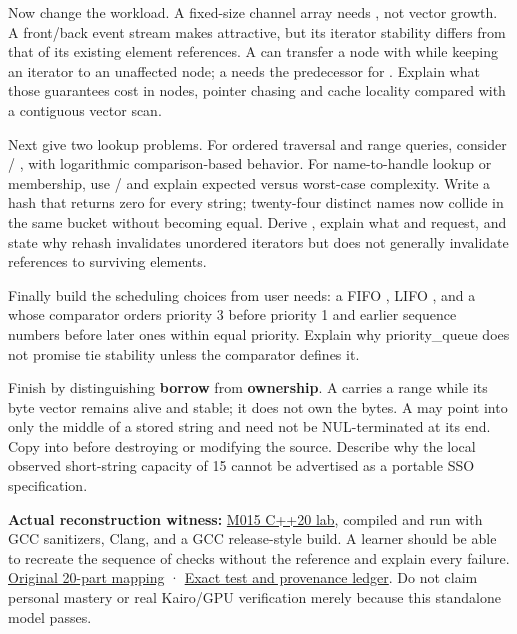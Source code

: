 Now change the workload. A fixed-size channel array needs , not vector growth. A front/back event stream makes  attractive, but its iterator stability differs from that of its existing element references. A  can transfer a node with  while keeping an iterator to an unaffected node; a  needs the predecessor for . Explain what those guarantees cost in nodes, pointer chasing and cache locality compared with a contiguous vector scan.

Next give two lookup problems. For ordered traversal and range queries, consider  / , with logarithmic comparison-based behavior. For name-to-handle lookup or membership, use  /  and explain expected versus worst-case complexity. Write a hash that returns zero for every string; twenty-four distinct names now collide in the same bucket without becoming equal. Derive , explain what  and  request, and state why rehash invalidates unordered iterators but does not generally invalidate references to surviving elements.

Finally build the scheduling choices from user needs: a FIFO , LIFO , and a  whose comparator orders priority 3 before priority 1 and earlier sequence numbers before later ones within equal priority. Explain why priority\_queue does not promise tie stability unless the comparator defines it.

Finish by distinguishing \textbf{borrow} from \textbf{ownership}. A  carries a range while its byte vector remains alive and stable; it does not own the bytes. A  may point into only the middle of a stored string and need not be NUL-terminated at its end. Copy  into  before destroying or modifying the source. Describe why the local observed short-string capacity of 15 cannot be advertised as a portable SSO specification.

\textbf{Actual reconstruction witness:} \hyperref[source-file-e829cf731b17419e282775cf]{M015 C++20 lab}, compiled and run with GCC sanitizers, Clang, and a GCC release-style build. A learner should be able to recreate the sequence of checks without the reference and explain every failure. \hyperref[appendix-fd090d982a15-m015-parts-231250-growing-the-asset-registry-without-losing-identities]{Original 20-part mapping} · \hyperref[appendix-a103e7846d21-phase-5-additive-reconstruction-m015-parts-231250]{Exact test and provenance ledger}. Do not claim personal mastery or real Kairo/GPU verification merely because this standalone model passes.

